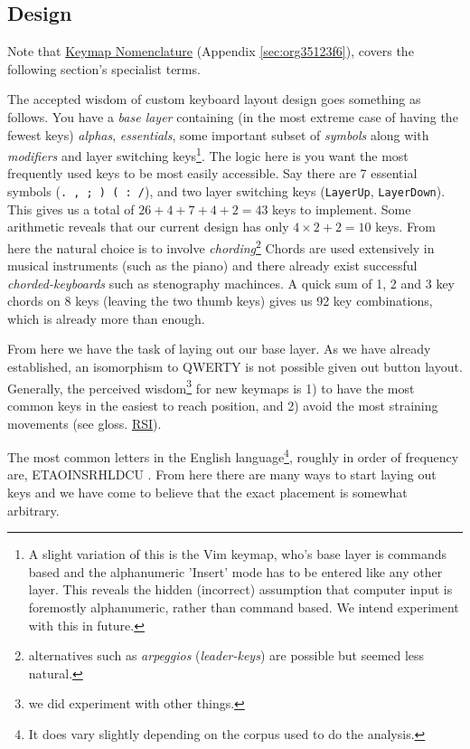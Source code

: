 \documentclass[logo,bsc,singlespacing,parskip]{infthesis}
\begin{document}
\subsection{Design}
\label{sec:org66edc6e}
Note that \hyperref[sec:org35123f6]{Keymap Nomenclature} (Appendix \ref{sec:org35123f6}), covers the following section's specialist terms.

The accepted wisdom of custom keyboard layout design goes something as follows.
You have a \emph{base layer} containing (in the most extreme case of having the fewest keys) \emph{alphas}, \emph{essentials}, some important subset of \emph{symbols} along with \emph{modifiers} and layer switching keys\footnote{A slight variation of this is the Vim \autocite{WelcomeHomeVim} keymap, who's base layer is commands based and the alphanumeric 'Insert' mode has to be entered like any other layer. This reveals the hidden (incorrect) assumption that computer input is foremostly alphanumeric, rather than command based. We intend experiment with this in future.}.
The logic here is you want the most frequently used keys to be most easily accessible.
Say there are 7 essential symbols (\texttt{. , ; ) ( : /}), and two layer switching keys (\texttt{LayerUp}, \texttt{LayerDown}).
This gives us a total of \(26+4+7+4+2=43\) keys to implement.
Some arithmetic reveals that our current design has only \(4\times2 + 2 = 10\) keys.
From here the natural choice is to involve \emph{chording}\footnote{alternatives such as \emph{arpeggios} (\emph{leader-keys}) are possible but seemed less natural.}
Chords are used extensively in musical instruments (such as the piano) and there already exist successful \emph{chorded-keyboards} such as stenography machinces.
A quick sum of 1, 2 and 3 key chords on 8 keys (leaving the two thumb keys) gives us 92 key combinations, which is already more than enough.

From here we have the task of laying out our base layer.
As we have already established, an isomorphism to QWERTY is not possible given out button layout.
Generally, the perceived wisdom\footnote{we did experiment with other things.} for new keymaps is 1) to have the most common keys in the easiest to reach position, and 2) avoid the most straining movements (see gloss. \hyperref[orgdb95c62]{RSI}).

The most common letters in the English language\footnote{It does vary slightly depending on the corpus used to do the analysis.}, roughly in order of frequency are, ETAOINSRHLDCU \autocite{norvigEnglishLetterFrequency}.
From here there are many ways to start laying out keys and we have come to believe that the exact placement is somewhat arbitrary.
\end{document}
